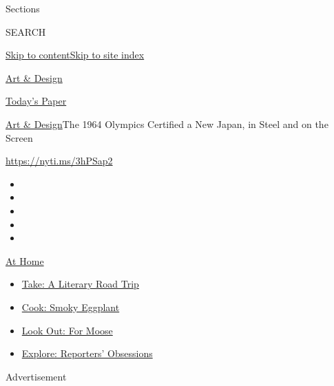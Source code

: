 Sections

SEARCH

\protect\hyperlink{site-content}{Skip to
content}\protect\hyperlink{site-index}{Skip to site index}

\href{https://www.nytimes.com/section/arts/design}{Art \& Design}

\href{https://myaccount.nytimes.com/auth/login?response_type=cookie\&client_id=vi}{}

\href{https://www.nytimes.com/section/todayspaper}{Today's Paper}

\href{/section/arts/design}{Art \& Design}\textbar{}The 1964 Olympics
Certified a New Japan, in Steel and on the Screen

\url{https://nyti.ms/3hPSap2}

\begin{itemize}
\item
\item
\item
\item
\item
\end{itemize}

\href{https://www.nytimes.com/spotlight/at-home?action=click\&pgtype=Article\&state=default\&region=TOP_BANNER\&context=at_home_menu}{At
Home}

\begin{itemize}
\tightlist
\item
  \href{https://www.nytimes.com/2020/07/28/books/time-for-a-literary-road-trip.html?action=click\&pgtype=Article\&state=default\&region=TOP_BANNER\&context=at_home_menu}{Take:
  A Literary Road Trip}
\item
  \href{https://www.nytimes.com/2020/07/29/magazine/bored-with-your-home-cooking-some-smoky-eggplant-will-fix-that.html?action=click\&pgtype=Article\&state=default\&region=TOP_BANNER\&context=at_home_menu}{Cook:
  Smoky Eggplant}
\item
  \href{https://www.nytimes.com/2020/07/27/travel/moose-michigan-isle-royale.html?action=click\&pgtype=Article\&state=default\&region=TOP_BANNER\&context=at_home_menu}{Look
  Out: For Moose}
\item
  \href{https://www.nytimes.com/interactive/2020/at-home/even-more-reporters-editors-diaries-lists-recommendations.html?action=click\&pgtype=Article\&state=default\&region=TOP_BANNER\&context=at_home_menu}{Explore:
  Reporters' Obsessions}
\end{itemize}

Advertisement

